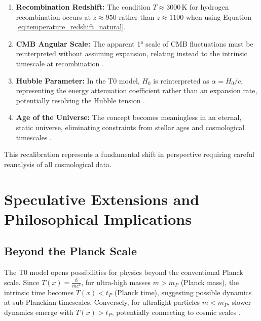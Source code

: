 \documentclass[12pt,a4paper]{article}
\newcommand{\Tfield}{T(x)}
\begin{document}
	\begin{enumerate}
		\item \textbf{Recombination Redshift:} The condition \(T \approx 3000 \, \text{K}\) for hydrogen recombination occurs at \(z \approx 950\) rather than \(z \approx 1100\) when using Equation \ref{eq:temperature_redshift_natural}.
		
		\item \textbf{CMB Angular Scale:} The apparent 1° scale of CMB fluctuations must be reinterpreted without assuming expansion, relating instead to the intrinsic timescale at recombination \cite{pascher_vereinheitlichung_2025}.
		
		\item \textbf{Hubble Parameter:} In the T0 model, \(H_0\) is reinterpreted as \(\alpha = H_0/c\), representing the energy attenuation coefficient rather than an expansion rate, potentially resolving the Hubble tension \cite{pascher_params_2025}.
		
		\item \textbf{Age of the Universe:} The concept becomes meaningless in an eternal, static universe, eliminating constraints from stellar ages and cosmological timescales \cite{pascher_perspective_2025}.
	\end{enumerate}
	
	This recalibration represents a fundamental shift in perspective requiring careful reanalysis of all cosmological data.
	
	\section{Speculative Extensions and Philosophical Implications}
	\label{sec:beyond_limits}
	
	\subsection{Beyond the Planck Scale}
	\label{subsec:beyond_planck}
	
	The T0 model opens possibilities for physics beyond the conventional Planck scale. Since \(\Tfield = \frac{\hbar}{mc^2}\), for ultra-high masses \(m > m_P\) (Planck mass), the intrinsic time becomes \(\Tfield < t_P\) (Planck time), suggesting possible dynamics at sub-Planckian timescales. Conversely, for ultralight particles \(m < m_P\), slower dynamics emerge with \(\Tfield > t_P\), potentially connecting to cosmic scales \cite{pascher_planck_2025}.
	
\end{document}
